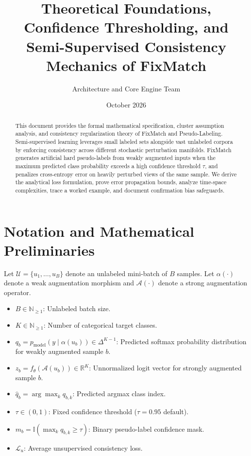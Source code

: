 \documentclass[11pt,a4paper]{article}
\title{\textbf{Theoretical Foundations, Confidence Thresholding, and Semi-Supervised Consistency Mechanics of FixMatch}}
\author{Architecture and Core Engine Team}
\date{October 2026}
\theoremstyle{definition}
\begin{document}
\maketitle

\begin{abstract}
This document provides the formal mathematical specification, cluster assumption analysis, and consistency regularization theory of FixMatch and Pseudo-Labeling. Semi-supervised learning leverages small labeled sets alongside vast unlabeled corpora by enforcing consistency across different stochastic perturbation manifolds. FixMatch generates artificial hard pseudo-labels from weakly augmented inputs when the maximum predicted class probability exceeds a high confidence threshold $\tau$, and penalizes cross-entropy error on heavily perturbed views of the same sample. We derive the analytical loss formulation, prove error propagation bounds, analyze time-space complexities, trace a worked example, and document confirmation bias safeguards.
\end{abstract}

\section{Notation and Mathematical Preliminaries}

Let $\mathcal{U} = \{u_1, \dots, u_B\}$ denote an unlabeled mini-batch of $B$ samples. Let $\alpha(\cdot)$ denote a weak augmentation morphism and $\mathcal{A}(\cdot)$ denote a strong augmentation operator.

\begin{itemize}
    \item $B \in \mathbb{N}_{\ge 1}$: Unlabeled batch size.
    \item $K \in \mathbb{N}_{\ge 1}$: Number of categorical target classes.
    \item $q_b = p_{\text{model}}(y \mid \alpha(u_b)) \in \Delta^{K-1}$: Predicted softmax probability distribution for weakly augmented sample $b$.
    \item $z_b = f_\theta(\mathcal{A}(u_b)) \in \mathbb{R}^K$: Unnormalized logit vector for strongly augmented sample $b$.
    \item $\hat{q}_b = \arg\max_k q_{b, k}$: Predicted argmax class index.
    \item $\tau \in (0, 1)$: Fixed confidence threshold ($\tau = 0.95$ default).
    \item $m_b = \mathbb{I}(\max_k q_{b, k} \ge \tau)$: Binary pseudo-label confidence mask.
    \item $\mathcal{L}_u$: Average unsupervised consistency loss.
\end{itemize}
\end{document}
